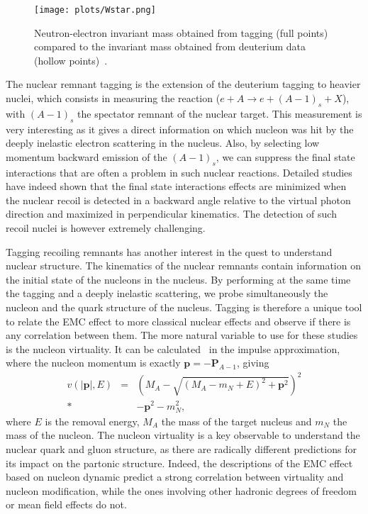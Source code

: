 \begin{figure}[tbp]
\centering\texttt{[image: plots/Wstar.png]}
\caption{Neutron-electron invariant mass obtained from tagging (full points) compared 
to the invariant mass obtained
from deuterium data (hollow points)~\cite{Baillie:2011za}.}
\label{fig:wstar}
\end{figure}

The nuclear remnant tagging is the extension of the deuterium tagging to heavier nuclei, which
consists in measuring the reaction ($e+A \rightarrow e+(A-1)_s+X$), with
$(A-1)_s$ the spectator remnant of the nuclear target. This measurement is very 
interesting as it gives a direct information on which nucleon was hit by the 
deeply inelastic electron scattering in the nucleus. Also, by selecting 
low momentum backward emission of the $(A-1)_s$, we can suppress the 
final state interactions that are often a problem in such nuclear reactions. 
Detailed studies~\cite{CiofidegliAtti:2003pb,Alvioli:2006jd} have indeed shown 
that the final state interactions effects are minimized when the nuclear recoil
is detected in a backward angle relative to 
the virtual photon direction and maximized in perpendicular kinematics.
The detection of such recoil nuclei is however extremely challenging.

Tagging recoiling remnants has another interest in the quest to understand nuclear structure.
The kinematics of the nuclear remnants contain information on the
initial state of the nucleons in the nucleus. By performing at the same time the 
tagging and a deeply inelastic scattering, we probe simultaneously the nucleon and the 
quark structure of the nucleus. Tagging is therefore a unique tool to relate the EMC
effect to more classical nuclear effects and observe if there is any correlation between
them. The more natural variable to use for these studies is the nucleon virtuality.
It can be calculated~\cite{CiofidegliAtti:2007ork} in the impulse 
approximation, where the nucleon momentum is exactly $\mathbf{p} = -\mathbf{P}_{A-1}$, 
giving
\begin{eqnarray}
    v(|\mathbf{p}|, E) &  =  & \left (M_A - \sqrt{(M_A - m_N + E)^2 + \mathbf{p}^2} \right )^2  \\* \nonumber
                    & & -  \mathbf{p}^2 - m_N^2,
\end{eqnarray} 
where $E$ is the removal energy, $M_A$ the mass of the target nucleus
and $m_N$ the mass of the nucleon. The nucleon virtuality is a key 
observable to understand the nuclear quark and gluon structure,
as there are radically different predictions for its impact on the partonic structure.
Indeed, the descriptions of the EMC effect based on nucleon dynamic 
predict a strong correlation between virtuality and nucleon modification,
while the ones involving other hadronic degrees of 
freedom or mean field effects do not. 

